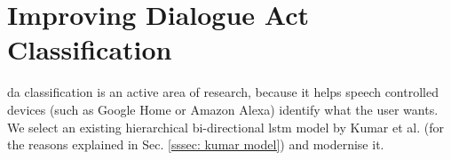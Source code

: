 
{\let\clearpage\relax \chapter[Dialogue Act Classification]{Improving Dialogue Act Classification}}

\gls{da} classification is an active area of research, because it helps speech controlled devices (such as Google Home or Amazon Alexa) identify what the user wants\cite{daApplications}. We select an existing hierarchical bi-directional \gls{lstm} \gls{model} by Kumar et al.\cite{kumar2017dialogue} (for the reasons explained in Sec. \ref{sssec: kumar model}) and modernise it.



\glsresetall
